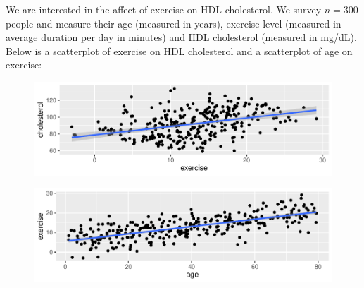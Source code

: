 \documentclass[12pt]{article}
\begin{document}
\problem We are interested in the affect of exercise on HDL cholesterol. We survey $n=300$ people and measure their age (measured in years), exercise level (measured in average duration per day in minutes) and HDL cholesterol (measured in mg/dL). Below is a scatterplot of exercise on HDL cholesterol and a scatterplot of age on exercise:


\vspace{-0.2cm}
\begin{figure}[htp]
\centering
\includegraphics[width=6.0in]{exercise_cholesterol}
\end{figure}
\FloatBarrier
\vspace{-0.7cm}

\vspace{-0.2cm}
\begin{figure}[htp]
\centering
\includegraphics[width=6.0in]{age_exercise}
\end{figure}
\FloatBarrier
\vspace{-0.7cm}
\end{document}
